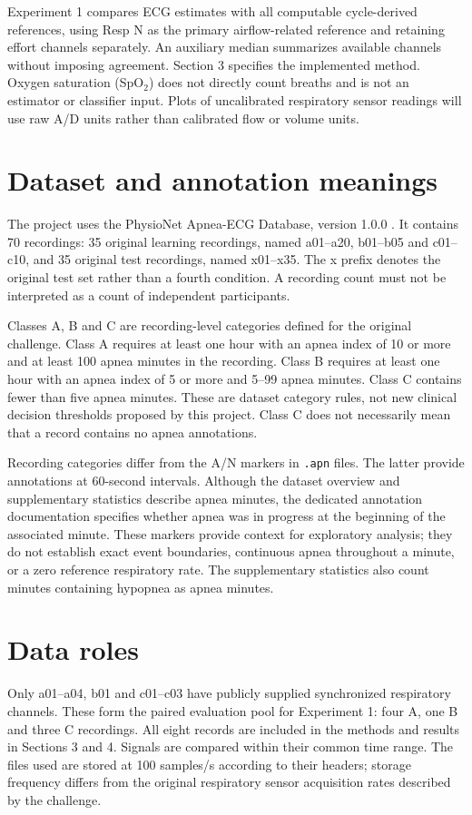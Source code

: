Experiment 1 compares ECG estimates with all computable cycle-derived references, using Resp N as the primary airflow-related reference and retaining effort channels separately. An auxiliary median summarizes available channels without imposing agreement. Section 3 specifies the implemented method. Oxygen saturation (SpO$_2$) does not directly count breaths and is not an estimator or classifier input. Plots of uncalibrated respiratory sensor readings will use raw A/D units rather than calibrated flow or volume units.

\section{Dataset and annotation meanings}
The project uses the PhysioNet Apnea-ECG Database, version 1.0.0 \cite{penzel}. It contains 70 recordings: 35 original learning recordings, named a01--a20, b01--b05 and c01--c10, and 35 original test recordings, named x01--x35. The x prefix denotes the original test set rather than a fourth condition. A recording count must not be interpreted as a count of independent participants.

Classes A, B and C are recording-level categories defined for the original challenge. Class A requires at least one hour with an apnea index of 10 or more and at least 100 apnea minutes in the recording. Class B requires at least one hour with an apnea index of 5 or more and 5--99 apnea minutes. Class C contains fewer than five apnea minutes. These are dataset category rules, not new clinical decision thresholds proposed by this project. Class C does not necessarily mean that a record contains no apnea annotations.

Recording categories differ from the A/N markers in \texttt{.apn} files. The latter provide annotations at 60-second intervals. Although the dataset overview and supplementary statistics describe apnea minutes, the dedicated annotation documentation specifies whether apnea was in progress at the beginning of the associated minute. These markers provide context for exploratory analysis; they do not establish exact event boundaries, continuous apnea throughout a minute, or a zero reference respiratory rate. The supplementary statistics also count minutes containing hypopnea as apnea minutes.

\section{Data roles}
Only a01--a04, b01 and c01--c03 have publicly supplied synchronized respiratory channels. These form the paired evaluation pool for Experiment 1: four A, one B and three C recordings. All eight records are included in the methods and results in Sections 3 and 4. Signals are compared within their common time range. The files used are stored at 100 samples/s according to their headers; storage frequency differs from the original respiratory sensor acquisition rates described by the challenge.

